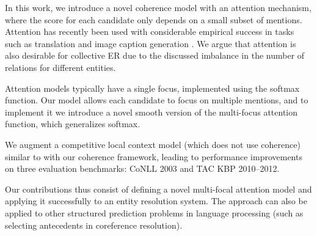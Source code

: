 


In this work, we introduce a novel coherence model with an attention mechanism, where the 
score for each candidate only depends on a small subset of mentions.
 Attention has recently been
used with considerable empirical success in tasks such as translation
\cite{bahdanau2014neural} and image caption generation
\cite{xu2015show}. We argue that attention is also desirable for
collective ER due to the discussed imbalance in the number of
relations for different entities.

Attention models typically have a single focus, implemented using the
 softmax function. Our model allows each candidate to
 focus on multiple mentions, and to implement it we introduce a 
 novel smooth version of the
 multi-focus attention function, which generalizes softmax.

We augment a competitive local context model (which does not use
coherence) similar to \cite{Lazic2015} with our coherence
framework, leading to performance improvements on three  evaluation benchmarks:
CoNLL 2003 \cite{Hoffart2011} and TAC KBP 2010--2012.

Our contributions thus consist of defining a novel multi-focal
attention model and applying it
successfully to an entity resolution system.  The approach can also be applied
to other structured prediction problems in language processing (such as
selecting antecedents in coreference resolution).  

